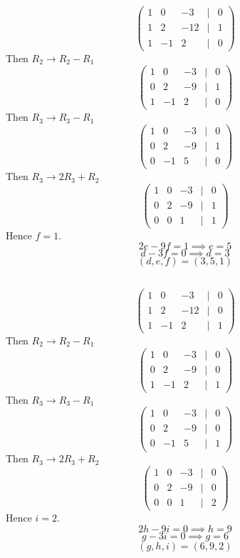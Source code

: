 \documentclass{article}
\begin{document}
\subsection{}
\[\begin{pmatrix}
    1&0&-3&|&0 \\ 1&2&-12&|&1 \\ 1&-1&2&|&0
\end{pmatrix}\]
Then \(R_2 \rightarrow R_2 - R_1\)
\[\begin{pmatrix}
    1&0&-3&|&0 \\ 0&2&-9&|&1 \\ 1&-1&2&|&0
\end{pmatrix}\]
Then \(R_3 \rightarrow R_3 - R_1\)
\[\begin{pmatrix}
    1&0&-3&|&0 \\ 0&2&-9&|&1 \\ 0&-1&5&|&0
\end{pmatrix}\]
Then \(R_3 \rightarrow 2R_3 + R_2\)
\[\begin{pmatrix}
    1&0&-3&|&0 \\ 0&2&-9&|&1 \\ 0&0&1&|&1
\end{pmatrix}\]
Hence \(f = 1\). 
\[2e-9f = 1 \implies e = 5\]
\[d-3f = 0 \implies d = 3\]
\[(d,e,f) = (3,5,1)\]
\subsection{}
\[\begin{pmatrix}
    1&0&-3&|&0 \\ 1&2&-12&|&0 \\ 1&-1&2&|&1
\end{pmatrix}\]
Then \(R_2 \rightarrow R_2 - R_1\)
\[\begin{pmatrix}
    1&0&-3&|&0 \\ 0&2&-9&|&0 \\ 1&-1&2&|&1
\end{pmatrix}\]
Then \(R_3 \rightarrow R_3 - R_1\)
\[\begin{pmatrix}
    1&0&-3&|&0 \\ 0&2&-9&|&0 \\ 0&-1&5&|&1
\end{pmatrix}\]
Then \(R_3 \rightarrow 2R_3 + R_2\)
\[\begin{pmatrix}
    1&0&-3&|&0 \\ 0&2&-9&|&0 \\ 0&0&1&|&2
\end{pmatrix}\]
Hence \(i = 2\). 
\[2h-9i=0 \implies h =9\]
\[g-3i = 0 \implies g = 6\]
\[(g,h,i) = (6,9,2)\]
\end{document}
